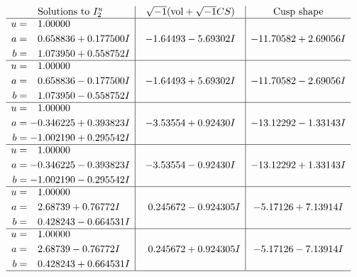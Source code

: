 \documentclass[1p]{elsarticle_modified}
\theoremstyle{definition}
\newcommand{\I}{\sqrt{-1}}
\begin{document}
$$\begin{array}{c|c|c}  
\text{Solutions to }I^u_{2}& \I (\text{vol} + \sqrt{-1}CS) & \text{Cusp shape}\\
 \hline 
\begin{aligned}
u &= \phantom{-}1.00000\phantom{ +0.000000I} \\
a &= \phantom{-}0.658836 + 0.177500 I \\
b &= \phantom{-}1.073950 + 0.558752 I\end{aligned}
 & -1.64493 - 5.69302 I & -11.70582 + 2.69056 I \\ \hline\begin{aligned}
u &= \phantom{-}1.00000\phantom{ +0.000000I} \\
a &= \phantom{-}0.658836 - 0.177500 I \\
b &= \phantom{-}1.073950 - 0.558752 I\end{aligned}
 & -1.64493 + 5.69302 I & -11.70582 - 2.69056 I \\ \hline\begin{aligned}
u &= \phantom{-}1.00000\phantom{ +0.000000I} \\
a &= -0.346225 + 0.393823 I \\
b &= -1.002190 + 0.295542 I\end{aligned}
 & -3.53554 + 0.92430 I & -13.12292 - 1.33143 I \\ \hline\begin{aligned}
u &= \phantom{-}1.00000\phantom{ +0.000000I} \\
a &= -0.346225 - 0.393823 I \\
b &= -1.002190 - 0.295542 I\end{aligned}
 & -3.53554 - 0.92430 I & -13.12292 + 1.33143 I \\ \hline\begin{aligned}
u &= \phantom{-}1.00000\phantom{ +0.000000I} \\
a &= \phantom{-}2.68739 + 0.76772 I \\
b &= \phantom{-}0.428243 - 0.664531 I\end{aligned}
 & \phantom{-}0.245672 - 0.924305 I & -5.17126 + 7.13914 I \\ \hline\begin{aligned}
u &= \phantom{-}1.00000\phantom{ +0.000000I} \\
a &= \phantom{-}2.68739 - 0.76772 I \\
b &= \phantom{-}0.428243 + 0.664531 I\end{aligned}
 & \phantom{-}0.245672 + 0.924305 I & -5.17126 - 7.13914 I\\
 \hline 
 \end{array}$$\newpage\newpage\renewcommand{\arraystretch}{1}
\end{document}

